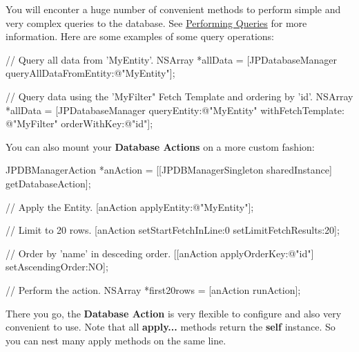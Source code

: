 You will enconter a huge number of convenient methods to perform simple and very complex queries to the database. See \hyperlink{queries}{Performing Queries} for more information. Here are some examples of some query operations: 
\begin{DoxyCode}
 // Query all data from 'MyEntity'.
 NSArray *allData = [JPDatabaseManager queryAllDataFromEntity:@"MyEntity"];
 
 // Query data using the 'MyFilter" Fetch Template and ordering by 'id'.
 NSArray *allData = [JPDatabaseManager queryEntity:@"MyEntity" withFetchTemplate:
      @"MyFilter" orderWithKey:@"id"];
\end{DoxyCode}
 You can also mount your {\bfseries Database Actions} on a more custom fashion: 
\begin{DoxyCode}
 JPDBManagerAction *anAction = [[JPDBManagerSingleton sharedInstance] 
      getDatabaseAction];
 
 // Apply the Entity.
 [anAction applyEntity:@"MyEntity"];
 
 // Limit to 20 rows.
 [anAction setStartFetchInLine:0 setLimitFetchResults:20];
 
 // Order by 'name' in desceding order.
 [[anAction applyOrderKey:@"id"] setAscendingOrder:NO];
 
 // Perform the action.
 NSArray *first20rows = [anAction runAction];
\end{DoxyCode}
 There you go, the {\bfseries Database Action} is very flexible to configure and also very convenient to use. Note that all {\bfseries apply...} methods return the {\bfseries self} instance. So you can nest many apply methods on the same line.\par
 \par
 
